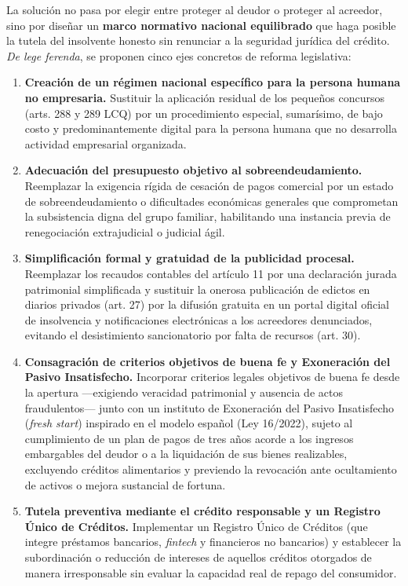 \documentclass[12pt,oneside]{book}
\begin{document}
La solución no pasa por elegir entre proteger al deudor o proteger al acreedor, sino por diseñar un \textbf{marco normativo nacional equilibrado} que haga posible la tutela del insolvente honesto sin renunciar a la seguridad jurídica del crédito. \textit{De lege ferenda}, se proponen cinco ejes concretos de reforma legislativa:

\begin{enumerate}
    \item \textbf{Creación de un régimen nacional específico para la persona humana no empresaria.} Sustituir la aplicación residual de los pequeños concursos (arts. 288 y 289 LCQ) por un procedimiento especial, sumarísimo, de bajo costo y predominantemente digital para la persona humana que no desarrolla actividad empresarial organizada.
    \item \textbf{Adecuación del presupuesto objetivo al sobreendeudamiento.} Reemplazar la exigencia rígida de cesación de pagos comercial por un estado de sobreendeudamiento o dificultades económicas generales que comprometan la subsistencia digna del grupo familiar, habilitando una instancia previa de renegociación extrajudicial o judicial ágil.
    \item \textbf{Simplificación formal y gratuidad de la publicidad procesal.} Reemplazar los recaudos contables del artículo 11 por una declaración jurada patrimonial simplificada y sustituir la onerosa publicación de edictos en diarios privados (art. 27) por la difusión gratuita en un portal digital oficial de insolvencia y notificaciones electrónicas a los acreedores denunciados, evitando el desistimiento sancionatorio por falta de recursos (art. 30).
    \item \textbf{Consagración de criterios objetivos de buena fe y Exoneración del Pasivo Insatisfecho.} Incorporar criterios legales objetivos de buena fe desde la apertura ---exigiendo veracidad patrimonial y ausencia de actos fraudulentos--- junto con un instituto de Exoneración del Pasivo Insatisfecho (\textit{fresh start}) inspirado en el modelo español (Ley 16/2022), sujeto al cumplimiento de un plan de pagos de tres años acorde a los ingresos embargables del deudor o a la liquidación de sus bienes realizables, excluyendo créditos alimentarios y previendo la revocación ante ocultamiento de activos o mejora sustancial de fortuna.
    \item \textbf{Tutela preventiva mediante el crédito responsable y un Registro Único de Créditos.} Implementar un Registro Único de Créditos (que integre préstamos bancarios, \textit{fintech} y financieros no bancarios) y establecer la subordinación o reducción de intereses de aquellos créditos otorgados de manera irresponsable sin evaluar la capacidad real de repago del consumidor.
\end{enumerate}
\end{document}
